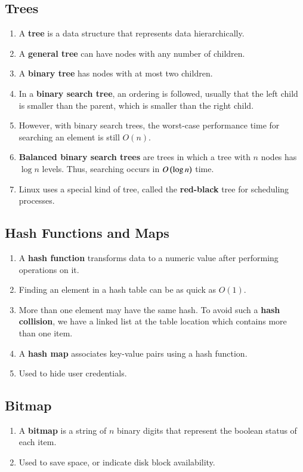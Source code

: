 \documentclass[journal,12pt,twocolumn]{IEEEtran}
\begin{document}
\subsection{Trees}
\begin{enumerate}
    \item A \textbf{tree} is a data structure that represents data hierarchically.
    \item A \textbf{general tree} can have nodes with any number of 
    children.
    \item A \textbf{binary tree} has nodes with at most two children.
    \item In a \textbf{binary search tree}, an ordering is followed, usually 
    that the left child is smaller than the parent, which is smaller than the   
    right child.
    \item However, with binary search trees, the worst-case performance time for 
    searching an element is still $O(n)$.
    \item \textbf{Balanced binary search trees} are trees in which a tree with 
    $n$ nodes has $\log n$ levels. Thus, searching occurs in $O\left(\log n\right)$
    time.
    \item Linux uses a special kind of tree, called the \textbf{red-black} 
    tree for scheduling processes. 
\end{enumerate}

\subsection{Hash Functions and Maps}
\begin{enumerate}
    \item A \textbf{hash function} transforms data to a numeric value after
    performing operations on it.
    \item Finding an element in a hash table can be as quick as $O(1)$.
    \item More than one element may have the same hash. To avoid such a 
    \textbf{hash collision}, we have a linked list at the table location
    which contains more than one item.
    \item A \textbf{hash map} associates key-value pairs using a hash function.
    \item Used to hide user credentials.
\end{enumerate}

\subsection{Bitmap}
\begin{enumerate}
    \item A \textbf{bitmap} is a string of $n$ binary digits that represent the 
    boolean status of each item.
    \item Used to save space, or indicate disk block availability.
\end{enumerate}
\end{document}
